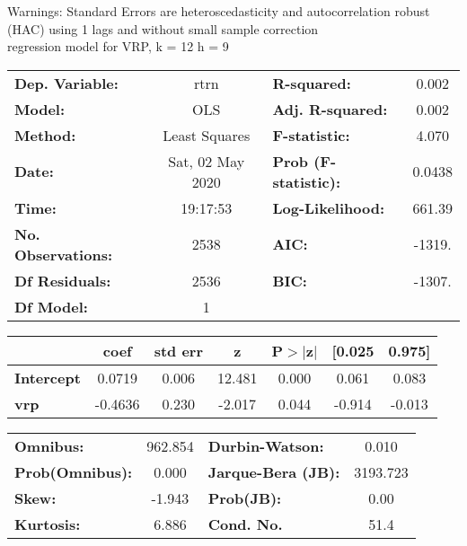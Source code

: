 Warnings: \newline
 [1] Standard Errors are heteroscedasticity and autocorrelation robust (HAC) using 1 lags and without small sample correction\\ 

regression model for VRP, k = 12 h = 9\begin{center}
\begin{tabular}{lclc}
\toprule
\textbf{Dep. Variable:}    &       rtrn       & \textbf{  R-squared:         } &     0.002   \\
\textbf{Model:}            &       OLS        & \textbf{  Adj. R-squared:    } &     0.002   \\
\textbf{Method:}           &  Least Squares   & \textbf{  F-statistic:       } &     4.070   \\
\textbf{Date:}             & Sat, 02 May 2020 & \textbf{  Prob (F-statistic):} &   0.0438    \\
\textbf{Time:}             &     19:17:53     & \textbf{  Log-Likelihood:    } &    661.39   \\
\textbf{No. Observations:} &        2538      & \textbf{  AIC:               } &    -1319.   \\
\textbf{Df Residuals:}     &        2536      & \textbf{  BIC:               } &    -1307.   \\
\textbf{Df Model:}         &           1      & \textbf{                     } &             \\
\bottomrule
\end{tabular}
\begin{tabular}{lcccccc}
                   & \textbf{coef} & \textbf{std err} & \textbf{z} & \textbf{P$> |$z$|$} & \textbf{[0.025} & \textbf{0.975]}  \\
\midrule
\textbf{Intercept} &       0.0719  &        0.006     &    12.481  &         0.000        &        0.061    &        0.083     \\
\textbf{vrp}       &      -0.4636  &        0.230     &    -2.017  &         0.044        &       -0.914    &       -0.013     \\
\bottomrule
\end{tabular}
\begin{tabular}{lclc}
\textbf{Omnibus:}       & 962.854 & \textbf{  Durbin-Watson:     } &    0.010  \\
\textbf{Prob(Omnibus):} &   0.000 & \textbf{  Jarque-Bera (JB):  } & 3193.723  \\
\textbf{Skew:}          &  -1.943 & \textbf{  Prob(JB):          } &     0.00  \\
\textbf{Kurtosis:}      &   6.886 & \textbf{  Cond. No.          } &     51.4  \\
\bottomrule
\end{tabular}
\end{center}

